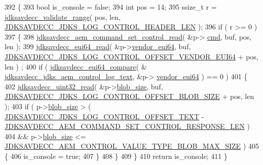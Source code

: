 \begin{DoxyCode}
392 \{
393     \textcolor{keywordtype}{bool} is\_console = \textcolor{keyword}{false};
394     \textcolor{keywordtype}{int} pos = 14;
395     ssize\_t r = \hyperlink{group__util_ga9c02bdfe76c69163647c3196db7a73a1}{jdksavdecc\_validate\_range}( pos, len, 
      \hyperlink{group__jdks__log_gaade756dffaac6e4f6d3d3b16e4cea38b}{JDKSAVDECC\_JDKS\_LOG\_CONTROL\_HEADER\_LEN} );
396     \textcolor{keywordflow}{if} ( r >= 0 )
397     \{
398         \hyperlink{group__command__set__control_ga3bffaa14c2bd112de565accfef21fedd}{jdksavdecc\_aem\_command\_set\_control\_read}( &p->
      \hyperlink{group__jdks_ga0c878e1ddbac611b7218077c5c482cde}{cmd}, buf, pos, len );
399         \hyperlink{group__eui64_ga7c7ee5c2d293106f4d997affcbc3ef15}{jdksavdecc\_eui64\_read}( &p->\hyperlink{group__jdks_ga6183c85748a8af0003d293d653c4ae9b}{vendor\_eui64}, buf, 
      \hyperlink{group__jdks__log_gaa09f0dec1864081c2abbc426b9e387fd}{JDKSAVDECC\_JDKS\_LOG\_CONTROL\_OFFSET\_VENDOR\_EUI64} + pos, len )
      ;
400         \textcolor{keywordflow}{if} ( \hyperlink{group__eui64_ga1d7414dc665866d8ad0af100f8a52ef2}{jdksavdecc\_eui64\_compare}( &
      \hyperlink{group__jdks__log_ga492c3be3079a48fdf9366bdc514c0333}{jdksavdecc\_jdks\_aem\_control\_log\_text}, &p->
      \hyperlink{group__jdks_ga6183c85748a8af0003d293d653c4ae9b}{vendor\_eui64} ) == 0 )
401         \{
402             \hyperlink{group__endian_gaf75f53076978e7b51f12c19414e6070e}{jdksavdecc\_uint32\_read}( &p->\hyperlink{group__jdks_ga32143551b70893faef60f6e35f88ed50}{blob\_size}, buf, 
      \hyperlink{group__jdks__log_ga14027480ca9c47f6e02e3d96e3e9a1ad}{JDKSAVDECC\_JDKS\_LOG\_CONTROL\_OFFSET\_BLOB\_SIZE} + pos, len );
403             \textcolor{keywordflow}{if} ( p->\hyperlink{group__jdks_ga32143551b70893faef60f6e35f88ed50}{blob\_size} > ( 
      \hyperlink{group__jdks__log_gaa3f2c42190fdfb5a9f8927254dcc38f0}{JDKSAVDECC\_JDKS\_LOG\_CONTROL\_OFFSET\_TEXT} - 
      \hyperlink{group__command__set__control__response_gad54c9d8dd021fce5cb24c880401d316f}{JDKSAVDECC\_AEM\_COMMAND\_SET\_CONTROL\_RESPONSE\_LEN} )
404                  && p->\hyperlink{group__jdks_ga32143551b70893faef60f6e35f88ed50}{blob\_size} <= 
      \hyperlink{group__aem__command_ga91176affe15020f1b22b04518eeb3d30}{JDKSAVDECC\_AEM\_CONTROL\_VALUE\_TYPE\_BLOB\_MAX\_SIZE} )
405             \{
406                 is\_console = \textcolor{keyword}{true};
407             \}
408         \}
409     \}
410     \textcolor{keywordflow}{return} is\_console;
411 \}
\end{DoxyCode}


